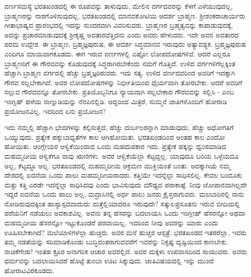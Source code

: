ವರ್ಣಸಮಸ್ಯೆ ಭರತಖಂಡದಲ್ಲಿ ಈ ರೂಪವನ್ನು ತಾಳುವುದು, ಮೇಲಿನ ವರ್ಗದವರನ್ನು ಕೆಳಗೆ ಎಳೆಯುವುದಲ್ಲ, ಬ್ರಾಹ್ಮಣರನ್ನು ನಾಶಗೊಳಿಸುವುದಲ್ಲ. ಭರತಖಂಡದಲ್ಲಿ ಮಾನವಕೋಟಿಯ ಆದರ್ಶ ಬ್ರಾಹ್ಮಣ. ಶ‍್ರೀಶಂಕರಾಚಾರ್ಯರು ಗೀತಾಭಾಷ್ಯದ ಪ್ರಾರಂಭದಲ್ಲಿ ಇದನ್ನು ಸುಂದರವಾಗಿ ವಿವರಿಸುವರು. ಬ್ರಾಹ್ಮಣರ ಬ್ರಹ್ಮತ್ವವನ್ನು ಕಾಪಾಡುವುದಕ್ಕೆ, ಅದನ್ನು ಪ್ರಚಾರಮಾಡುವುದಕ್ಕೆ ಶ‍್ರೀಕೃಷ್ಣ ಅವತಾರವೆತ್ತಿದನು ಎಂದು ಅವರು ಹೇಳುವರು. ಇದೇ ಅವನ ಅವತಾರದ ಪರಮ ಉದ್ದೇಶ. ಈ ಬ್ರಾಹ್ಮಣ, ಬ್ರಹ್ಮಜ್ಞಪುರುಷ, ಈ ಆದರ್ಶ ಸಿದ್ಧಮಾನವ ಇರುವುದು ಅತ್ಯಾವಶ್ಯಕ. ಬ್ರಹ್ಮಜ್ಞಪುರುಷ ಎಂದಿಗೂ ಮಾಯವಾಗಕೂಡದು. ಈಗ ಇರುವ ವರ್ಣಗಳಲ್ಲಿ ಎಷ್ಟೋ ಲೋಪದೋಷಗಳಿವೆ. ಆದರೆ ಎಲ್ಲರೂ ಬ್ರಾಹ್ಮಣರಿಗೆ ಈ ಗೌರವವನ್ನು ಕೊಡುವುದಕ್ಕೆ ಸಿದ್ಧರಾಗಿರಬೇಕೆಂದು ನಮಗೆ ಗೊತ್ತಿದೆ. ಉಳಿದ ವರ್ಗಗಳಿಗೆಲ್ಲಕ್ಕಿಂತ ಹೆಚ್ಚಾಗಿ ಬ್ರಾಹ್ಮಣ ವರ್ಗದಲ್ಲಿ ಹೆಚ್ಚು ಬ್ರಹ್ಮಜ್ಞರಿರುವರು. ಇದು ಸತ್ಯ. ಉಳಿದ ವರ್ಣದವರಿಂದ ಅವರಿಗೆ ಇದಕ್ಕಾಗಿ ಗೌರವ ಸಲ್ಲಬೇಕಾಗಿದೆ. ಅವರ ಲೋಪದೋಷಗಳನ್ನು ನಿರ್ಭೀತಿಯಿಂದ ಧೈರ್ಯವಾಗಿ ತೋರಬೇಕು. ಆದರೆ ಅವರಿಗೆ ಸಲ್ಲುವ ಗೌರವವನ್ನೂ ತೋರಬೇಕು.  ಪ್ರತಿಯೊಬ್ಬನಿಗೂ ನ್ಯಾಯವಾಗಿ ಸಲ್ಲಬೇಕಾದ ಗೌರವವನ್ನು ಸಲ್ಲಿಸಿ - ಎಂಬ ಇಂಗ್ಲಿಷ್​ ಹಳೆಯ ನಾಣ್ನುಡಿಯನ್ನು ನೆನಪಿನಲ್ಲಿಡಿ. ಆದ್ದರಿಂದ ಮಿತ್ರರೆ, ಸುಮ್ಮನೆ ಜಾತಿಗಳೊಂದಿಗೆ ಹೋರಾಡಿ ಪ್ರಯೋಜನವಿಲ್ಲ. ಇದರಿಂದ ಏನು ಪ್ರಯೋಜನ?

ಇದು ನಮ್ಮಲ್ಲಿ ಹೆಚ್ಚಾಗಿ ಭೇದಗಳನ್ನು ಕಲ್ಪಿಸುತ್ತದೆ, ಹೆಚ್ಚು ದುರ್ಬಲರನ್ನಾಗಿ ಮಾಡುವುದು, ಹೆಚ್ಚು ಅಧೋಗತಿಗೆ ಒಯ್ಯುವುದು. ಪ್ರತ್ಯೇಕ ಹಕ್ಕುಬಾಧ್ಯತೆಗಳ ಕಾಲ ಆಗಿಹೋಯಿತು. ಭರತಖಂಡದಿಂದ ಅಂತಹ ಕಾಲ ಎಂದೋ ಹೋಯಿತು. ಆಂಗ್ಲೇಯರ ಆಳ್ವಿಕೆಯಿಂದಾದ ಒಂದು ಮಹದುಪಕಾರ ಇದು. ಪ್ರತ್ಯೇಕ ಹಕ್ಕನ್ನು ಧ್ವಂಸಮಾಡಿದ ಮಹಮ್ಮದೀಯ ಆಳ್ವಿಕೆಗೂ ನಾವು ಋಣಿಗಳು. ಅವರ ಆಳ್ವಿಕೆಯೆಲ್ಲಾ ಕೆಟ್ಟದ್ದಲ್ಲ. ಯಾವುದೂ ಬರಿಯ ಒಳ್ಳೆಯದೂ ಅಲ್ಲ, ಕೆಟ್ಟದ್ದೂ ಅಲ್ಲ. ಭರತಖಂಡದಲ್ಲಿ ಮಹಮ್ಮದೀಯ ಆಕ್ರಮಣ ಮುಕ್ತಿಯಂತೆ ಬಂತು. ಅದಕ್ಕಾಗಿಯೆ ನಮ್ಮ ದೇಶದಲ್ಲಿ ಐದನೆಯ ಒಂದು ಪಾಲು ಮಹಮ್ಮದೀಯರಾದರು. ಕತ್ತಿಯೇ ಇದನ್ನೆಲ್ಲಾ ಸಾಧಿಸಲಿಲ್ಲ. ಕೇವಲ ಬಂದೂಕು ಮತ್ತು ಕತ್ತಿ ಎರಡೇ ಇದನ್ನೆಲ್ಲಾ ಸಾಧಿಸಿದವು ಎಂದು ಭಾವಿಸುವುದು ಮೌಢ್ಯದ ಪರಾಕಾಷ್ಠೆ. ನೀವು ಜೋಪಾನವಾಗಿಲ್ಲದೇ ಇದ್ದರೆ ಐದನೆಯ ಒಂದು ಪಾಲು ಅಲ್ಲ, ಮದ್ರಾಸಿನಲ್ಲಿ ಅರ್ಧ ಪಾಲು ಜನರು ಕ್ರೈಸ್ತರಾಗುವರು. ಮಲಬಾರಿನಲ್ಲಿ ನಾನು ನೋಡಿರುವುದಕ್ಕಿಂತ ಹಾಸ್ಯಾಸ್ಪದವಾದುದು ಮತ್ತೆಲ್ಲಿಯಾದರೂ ಇರುವುದೇ? ಸತ್ಕುಲಪ್ರಸೂತನು ಇರುವ ಬೀದಿಯಲ್ಲಿ ಪರೆಯನಿಗೆ ನಡೆಯಲು ಅವಕಾಶವಿಲ್ಲ. ಅವನು ತನ್ನ ಹೆಸರನ್ನು ಬದಲಾಯಸಿ ಒಂದು ಇಂಗ್ಲೀಷ್​ ಹೆಸರನ್ನೋ ಅಥವಾ ಮಹಮ್ಮದೀಯ ಹೆಸರನ್ನೋ ಇಟ್ಟುಕೊಂಡರೆ ಪರವಾಯಿಲ್ಲ. ಇದರಿಂದ ನೀವು ಅವರನ್ನು ಯಾರು ಎಂದು ಊಹಿಸಬೇಕಾಗಿದೆ? ಮಲೆಯಾಳಿಗಳೆಲ್ಲಾ ಹುಚ್ಚರು. ಅವರ ಮನೆ ಹುಚ್ಚರ ಆಸ್ಪತ್ರೆ. ಭರತಖಂಡದ ಇತರರೆಲ್ಲಾ, ಇವರು ತಮ್ಮ ನಡತೆಯನ್ನು ಸರಿಮಾಡಿಕೊಂಡು ಬುದ್ಧಿವಂತರಾಗುವವರೆಗೆ ಇವರನ್ನು ನಿಕೃಷ್ಟ ದೃಷ್ಟಿಯಿಂದ ಕಾಣಬೇಕು. ನಾಚಿಕೆಗೇಡು! ಇಂತಹ ಕ್ರೂರ ಅನಾಗರಿಕ ಆಚಾರ ಅವರಲ್ಲಿದೆ. ಅವರ ಮಕ್ಕಳು ಉಪವಾಸದಿಂದ ಸಾಯುವರು. ಅವರು ಧರ್ಮವನ್ನು ಬದಲಾಯಿಸಿದರೆ ಹೊಟ್ಟೆ ತುಂಬಾ ಊಟ ಸಿಕ್ಕುವುದು. ಜಾತಿವಿಷಯದಲ್ಲಿ ಇನ್ನು ಮುಂದೆ ಹೋರಾಟವಿರಕೂಡದು.

\vskip 4pt

